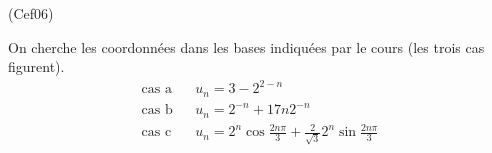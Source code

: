 \begin{tiny}(Cef06)\end{tiny}
On cherche les coordonnées dans les bases indiquées par le cours (les trois cas figurent). 
\begin{align*}
\text{cas a}& &u_n = 3 - 2^{2-n} \\
\text{cas b}& &u_n = 2^{-n} + 17n2^{-n}\\
\text{cas c}& &u_n = 2^{n}\cos\frac{2n\pi}{3} + \frac{2}{\sqrt{3}}2^{n}\sin\frac{2n\pi}{3} \\
\end{align*}
